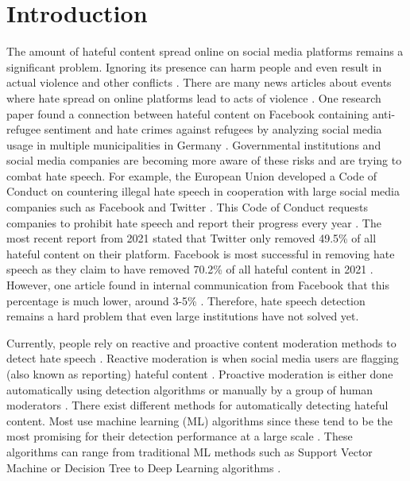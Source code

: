 \chapter{Introduction}
\label{ch:introduction}
\newcommand{\customtextbox}[1]{
	\setlength{\fboxsep}{0.5em}
	\fbox{
		\begin{minipage}{\linewidth-1.7em}
			\vspace*{0.25em}
			#1
		\end{minipage}
	}
}

The amount of hateful content spread online on social media platforms remains a significant problem. Ignoring its presence can harm people and even result in actual violence and other conflicts \citep{ecri-hate-speech-and-violence, balayn2021automatic}. There are many news articles about events where hate spread on online platforms lead to acts of violence \citep{columbia-facebook-linked-to-violence, mujib-mashal-india, paul-mozur-2018, muller2021fanning}. One research paper found a connection between hateful content on Facebook containing anti-refugee sentiment and hate crimes against refugees by analyzing social media usage in multiple municipalities in Germany \citep{muller2021fanning}. Governmental institutions and social media companies are becoming more aware of these risks and are trying to combat hate speech. For example, the European Union developed a Code of Conduct on countering illegal hate speech in cooperation with large social media companies such as Facebook and Twitter \citep{eu-code-of-conduct}. This Code of Conduct requests companies to prohibit hate speech and report their progress every year \citep{eu-code-of-conduct}. The most recent report from 2021 stated that Twitter only removed 49.5\% of all hateful content on their platform. Facebook is most successful in removing hate speech as they claim to have removed 70.2\% of all hateful content in 2021 \citep{eu-code-of-conduct}. However, one article found in internal communication from Facebook that this percentage is much lower, around 3-5\% \citep{noah2021giansiracusa}. Therefore, hate speech detection remains a hard problem that even large institutions have not solved yet.

Currently, people rely on reactive and proactive content moderation methods to detect hate speech \citep{klonick2017new}. Reactive moderation is when social media users are flagging (also known as reporting) hateful content \citep{klonick2017new}. Proactive moderation is either done automatically using detection algorithms or manually by a group of human moderators \citep{klonick2017new}. There exist different methods for automatically detecting hateful content. Most use machine learning (ML) algorithms since these tend to be the most promising for their detection performance at a large scale \citep{balayn2021automatic, fortuna2018survey}. These algorithms can range from traditional ML methods such as Support Vector Machine or Decision Tree to Deep Learning algorithms \citep{fortuna2018survey}.


